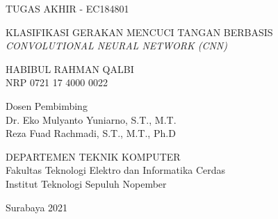 TUGAS AKHIR - EC184801

\vspace{6ex}

\begin{large}
  KLASIFIKASI GERAKAN MENCUCI TANGAN BERBASIS \emph{CONVOLUTIONAL NEURAL NETWORK (CNN)}
\end{large}

\vspace{4ex}

HABIBUL RAHMAN QALBI \\
NRP 0721 17 4000 0022

\vspace{2ex}

Dosen Pembimbing \\
Dr. Eko Mulyanto Yuniarno, S.T., M.T. \\
Reza Fuad Rachmadi, S.T., M.T., Ph.D

\vspace{6ex}

DEPARTEMEN TEKNIK KOMPUTER \\
Fakultas Teknologi Elektro dan Informatika Cerdas\\
Institut Teknologi Sepuluh Nopember

Surabaya 2021
